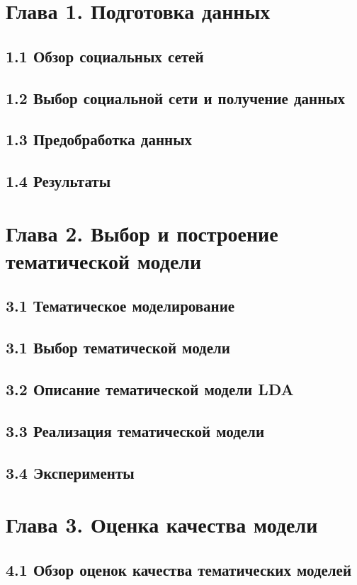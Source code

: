 \documentclass[a4paper]{report}
\begin{document}
	\section{Глава 1. Подготовка данных}
	\subsection{1.1 Обзор социальных сетей}
	\subsection{1.2 Выбор социальной сети и получение данных}
	\subsection{1.3 Предобработка данных}
	\subsection{1.4 Результаты} 
	
	\section{Глава 2. Выбор и построение тематической модели}
	\subsection{3.1 Тематическое моделирование}
	\subsection{3.1 Выбор тематической модели}
	\subsection{3.2 Описание тематической модели LDA}
	\subsection{3.3 Реализация тематической модели}
	\subsection{3.4 Эксперименты}
	
	\section{Глава 3. Оценка качества модели}
	\subsection{4.1 Обзор оценок качества тематических моделей}
\end{document}
